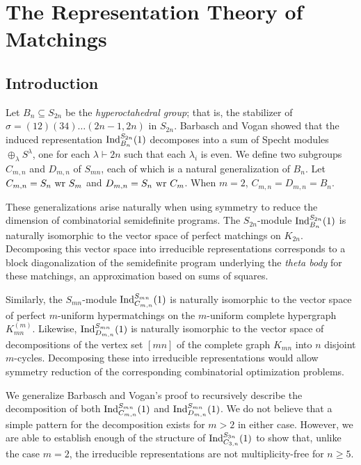 
\chapter{The Representation Theory of Matchings}
\label{chap:matchings}

\section{Introduction} \label{BV:Introduction}
Let $B_n \subseteq S_{2n}$ be the {\em hyperoctahedral group}; that is, the stabilizer of $\sigma = (12)(34)\ldots (2n-1,2n)$ in $S_{2n}$. Barbasch and Vogan \cite{bv} showed that the induced representation $\textup{Ind}_{B_n}^{S_{2n}}(1)$ decomposes into a sum of Specht modules $\oplus_\lambda S^\lambda$, one for each $\lambda \vdash 2n$ such that each $\lambda_i$ is even.
We define two subgroups $C_{m,n}$ and $D_{m,n}$ of $S_{mn}$, each of which is a natural generalization of $B_n$. 
Let $C_{m,n} = S_n \textup{ wr } S_m$ and $D_{m,n} = S_n \textup{ wr } C_m$. When $m=2$, $C_{m,n} = D_{m,n} = B_n$.

These generalizations arise naturally when using symmetry to reduce the dimension of combinatorial semidefinite programs. The $S_{2n}$-module $\textup{Ind}_{B_n}^{S_{2n}}(1)$ is naturally isomorphic to the vector space of perfect matchings on $K_{2n}$. Decomposing this vector space into irreducible representations corresponds to a block diagonalization of the semidefinite program underlying the {\em theta body} for these matchings, an approximation based on sums of squares.

Similarly, the $S_{mn}$-module $\textup{Ind}_{C_{m,n}}^{S_{mn}}(1)$ is naturally isomorphic to the vector space of perfect $m$-uniform hypermatchings on the $m$-uniform complete hypergraph $K^(m)_{mn}$. Likewise, $\textup{Ind}_{D_{m,n}}^{S_{mn}}(1)$ is naturally isomorphic to the vector space of decompositions of the vertex set $[mn]$ of the complete graph $K_{mn}$ into $n$ disjoint $m$-cycles. Decomposing these into irreducible representations would allow symmetry reduction of the corresponding combinatorial optimization problems.

We generalize Barbasch and Vogan's proof to recursively describe the decomposition of both $\textup{Ind}_{C_{m,n}}^{S_{mn}}(1)$ and $\textup{Ind}_{D_{m,n}}^{S_{mn}}(1)$. 
We do not believe that a simple pattern for the decomposition exists for $m > 2$ in either case.
However, we are able to establish enough of the structure of $\textup{Ind}_{C_{3,n}}^{S_{3n}}(1)$ to show that, unlike the case $m=2$,
the irreducible representations are not multiplicity-free for $n \ge 5$.

